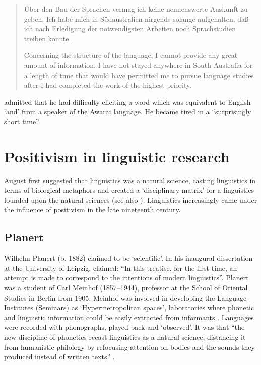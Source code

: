 \documentclass[output=paper]{../langscibook}
\begin{document}
\begin{quote}
    Über den Bau der Sprachen vermag ich keine nennenswerte Auskunft zu geben. Ich habe mich in Südaustralien nirgends solange aufgehalten, daß ich nach Erledigung der notwendigsten Arbeiten noch Sprachstudien treiben konnte. 

    Concerning the structure of the language, I cannot provide any great amount of information. I have not stayed anywhere in South Australia for a length of time that would have permitted me to pursue language studies after I had completed the work of the highest priority. \citep[81]{eylmann_eingeborenen_1908}
\end{quote}

\citet[81]{eylmann_eingeborenen_1908} admitted that he had difficulty eliciting a word which was equivalent to English ‘and’ from a speaker of the Awarai language. He became tired in a ``surprisingly short time''.

\section{Positivism in linguistic research}

August \citet{schleicher_sprachen_1983}  first suggested that linguistics was a natural science, casting linguistics in terms of biological metaphors and created a ‘disciplinary matrix’ for a linguistics founded upon the natural sciences (see also \citealt{mcelvenny_august_2018}). Linguistics increasingly came under the influence of positivism in the late nineteenth century.

\subsection{Planert}

Wilhelm Planert (b. 1882) claimed to be ‘scientific’. In his inaugural dissertation at the University of Leipzig, \citet{planert_syntaktischen_1907} claimed: “In this treatise, for the first time, an attempt is made to correspond to the intentions of modern linguistics”. Planert was a student of Carl Meinhof (1857--1944), professor at the School of Oriental Studies in Berlin from 1905. Meinhof was involved in developing the Language Institutes (Seminars) as ‘Hypermetropolitan spaces’, laboratories where phonetic and linguistic information could be easily extracted from informants \citep[138]{pugach_africa_2012}. Languages were recorded with phonographs, played back and ‘observed’. It was that “the new discipline of phonetics recast linguistics as a natural science, distancing it from humanistic philology by refocusing attention on bodies and the sounds they produced instead of written texts” \citep[93]{pugach_africa_2012}. 
\end{document}
